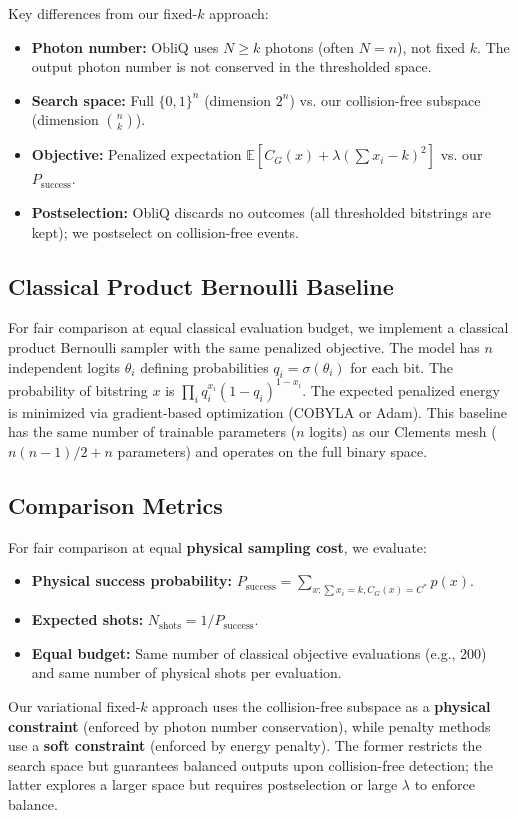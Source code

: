 Key differences from our fixed-$k$ approach:
\begin{itemize}
\item \textbf{Photon number:} ObliQ uses $N \ge k$ photons (often $N=n$), not fixed $k$. The output photon number is not conserved in the thresholded space.
\item \textbf{Search space:} Full $\{0,1\}^n$ (dimension $2^n$) vs. our collision-free subspace (dimension $\binom{n}{k}$).
\item \textbf{Objective:} Penalized expectation $\mathbb{E}[C_G(x) + \lambda(\sum x_i - k)^2]$ vs. our $P_{\mathrm{success}}$.
\item \textbf{Postselection:} ObliQ discards no outcomes (all thresholded bitstrings are kept); we postselect on collision-free events.
\end{itemize}

\subsection{Classical Product Bernoulli Baseline}

For fair comparison at equal classical evaluation budget, we implement a classical product Bernoulli sampler with the same penalized objective. The model has $n$ independent logits $\theta_i$ defining probabilities $q_i = \sigma(\theta_i)$ for each bit. The probability of bitstring $x$ is $\prod_i q_i^{x_i}(1-q_i)^{1-x_i}$. The expected penalized energy is minimized via gradient-based optimization (COBYLA or Adam). This baseline has the same number of trainable parameters ($n$ logits) as our Clements mesh ($n(n-1)/2 + n$ parameters) and operates on the full binary space.

\subsection{Comparison Metrics}

For fair comparison at equal \textbf{physical sampling cost}, we evaluate:
\begin{itemize}
\item \textbf{Physical success probability:} $P_{\mathrm{success}} = \sum_{x: \sum x_i=k, C_G(x)=C^*} p(x)$.
\item \textbf{Expected shots:} $N_{\mathrm{shots}} = 1/P_{\mathrm{success}}$.
\item \textbf{Equal budget:} Same number of classical objective evaluations (e.g., 200) and same number of physical shots per evaluation.
\end{itemize}

Our variational fixed-$k$ approach uses the collision-free subspace as a \textbf{physical constraint} (enforced by photon number conservation), while penalty methods use a \textbf{soft constraint} (enforced by energy penalty). The former restricts the search space but guarantees balanced outputs upon collision-free detection; the latter explores a larger space but requires postselection or large $\lambda$ to enforce balance.
